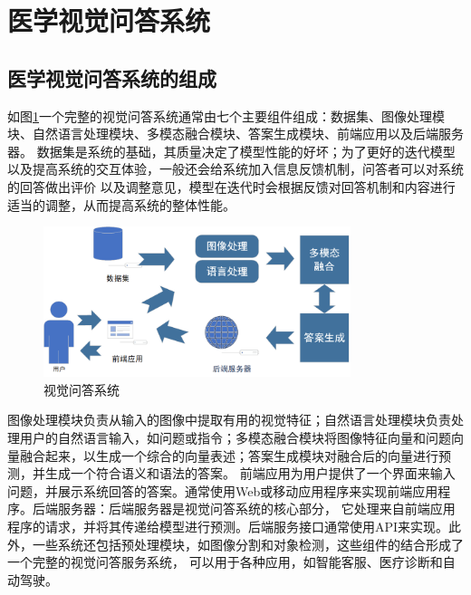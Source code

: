 \section{医学视觉问答系统}
\subsection{医学视觉问答系统的组成}
如图\ref{sys_need}一个完整的视觉问答系统通常由七个主要组件组成：数据集、图像处理模块、自然语言处理模块、多模态融合模块、答案生成模块、前端应用以及后端服务器。
数据集是系统的基础，其质量决定了模型性能的好坏；为了更好的迭代模型以及提高系统的交互体验，一般还会给系统加入信息反馈机制，问答者可以对系统的回答做出评价
以及调整意见，模型在迭代时会根据反馈对回答机制和内容进行适当的调整，从而提高系统的整体性能。
\begin{figure}[htbp]
	\centering	
	\includegraphics[width=0.8\textwidth]{Fig/myfig/chapter2/sys_vqa.png}  %
	\caption{\label{sys_need}视觉问答系统} 
\end{figure}

图像处理模块负责从输入的图像中提取有用的视觉特征；自然语言处理模块负责处理用户的自然语言输入，如问题或指令；多模态融合模块将图像特征向量和问题向量融合起来，以生成一个综合的向量表述；答案生成模块对融合后的向量进行预测，并生成一个符合语义和语法的答案。
前端应用为用户提供了一个界面来输入问题，并展示系统回答的答案。通常使用Web或移动应用程序来实现前端应用程序。后端服务器：后端服务器是视觉问答系统的核心部分，
它处理来自前端应用程序的请求，并将其传递给模型进行预测。后端服务接口通常使用API来实现。此外，一些系统还包括预处理模块，如图像分割和对象检测，这些组件的结合形成了一个完整的视觉问答服务系统，
可以用于各种应用，如智能客服、医疗诊断和自动驾驶。

